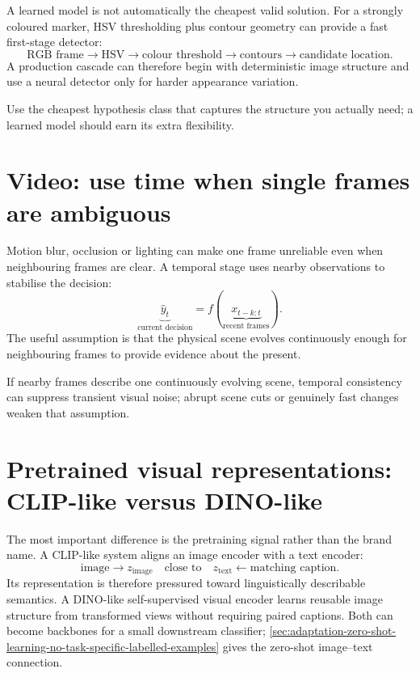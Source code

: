 A learned model is not automatically the cheapest valid solution.
For a strongly coloured marker, HSV thresholding plus contour geometry can provide a fast first-stage detector:
\[
\text{RGB frame}
\rightarrow
\text{HSV}
\rightarrow
\text{colour threshold}
\rightarrow
\text{contours}
\rightarrow
\text{candidate location}.
\]
A production cascade can therefore begin with deterministic image structure and use a neural detector only for harder appearance variation.

\begin{calloutpractical}
Use the cheapest hypothesis class that captures the structure you actually need; a learned model should earn its extra flexibility.
\end{calloutpractical}

\section{Video: use time when single frames are ambiguous}
\label{sec:cnn-temporal}
Motion blur, occlusion or lighting can make one frame unreliable even when neighbouring frames are clear.
A temporal stage uses nearby observations to stabilise the decision:
\[
\underbrace{\hat y_t}_{\text{current decision}}
=
f(
\underbrace{x_{t-k:t}}_{\text{recent frames}}
).
\]
The useful assumption is that the physical scene evolves continuously enough for neighbouring frames to provide evidence about the present.

\begin{calloutbias}
If nearby frames describe one continuously evolving scene, temporal consistency can suppress transient visual noise; abrupt scene cuts or genuinely fast changes weaken that assumption.
\end{calloutbias}

\section{Pretrained visual representations: CLIP-like versus DINO-like}
\label{sec:cnn-pretrained-visual-representations}
The most important difference is the pretraining signal rather than the brand name.
A CLIP-like system aligns an image encoder with a text encoder:
\[
\text{image}
\rightarrow
z_{\text{image}}
\quad\text{close to}\quad
z_{\text{text}}
\leftarrow
\text{matching caption}.
\]
Its representation is therefore pressured toward linguistically describable semantics.
A DINO-like self-supervised visual encoder learns reusable image structure from transformed views without requiring paired captions.
Both can become backbones for a small downstream classifier; \cref{sec:adaptation-zero-shot-learning-no-task-specific-labelled-examples} gives the zero-shot image--text connection.

